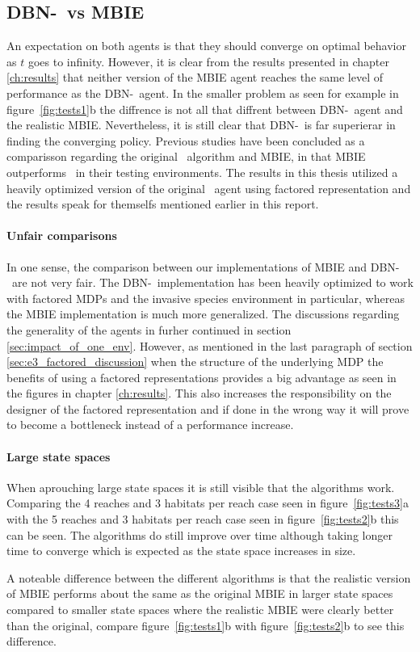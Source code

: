 \subsection{DBN-\etre\ vs MBIE }
An expectation on both agents is that they should converge on optimal behavior as $t$ goes to infinity. However, it is clear from the results presented in chapter \ref{ch:results} that neither version of the MBIE agent reaches the same level of performance as the DBN-\etre\ agent. In the smaller problem as seen for example in figure~\ref{fig:tests1}b the diffrence is not all that diffrent between DBN-\etre\ agent and the realistic MBIE. Nevertheless, it is still clear that DBN-\etre\ is far superierar in finding the converging policy. Previous studies have been concluded as a comparisson regarding the original \etre\ algorithm and MBIE, in \textcite{strehl2004empirical} that MBIE outperforms \etre\ in their testing environments. The results in this thesis utilized a heavily optimized version of the original \etre\ agent using factored representation and the results speak for themselfs mentioned earlier in this report. 

\paragraph{Unfair comparisons} In one sense, the comparison between our implementations of MBIE and DBN-\etre\ are not very fair. The DBN-\etre\ implementation has been heavily optimized to work with factored MDPs and the invasive species environment in particular, whereas the MBIE implementation is much more generalized. The discussions regarding the generality of the agents in furher continued in section \ref{sec:impact_of_one_env}. However, as mentioned in the last paragraph of section \ref{sec:e3_factored_discussion} when the structure of the underlying MDP the benefits of using a factored representations provides a big advantage as seen in the figures in chapter \ref{ch:results}. This also increases the responsibility on the designer of the factored representation and if done in the wrong way it will prove to become a bottleneck instead of a performance increase.

\paragraph{Large state spaces}
When aprouching large state spaces it is still visible that the algorithms work. Comparing the 4 reaches and 3 habitats per reach case seen in figure~\ref{fig:tests3}a with the 5 reaches and 3 habitats per reach case seen in figure~\ref{fig:tests2}b this can be seen. The algorithms do still improve over time although taking longer time to converge which is expected as the state space increases in size. 

A noteable difference between the different algorithms is that the realistic version of MBIE performs about the same as the original MBIE in larger state spaces compared to smaller state spaces where the realistic MBIE were clearly better than the original, compare figure~\ref{fig:tests1}b with figure~\ref{fig:tests2}b to see this difference. 

